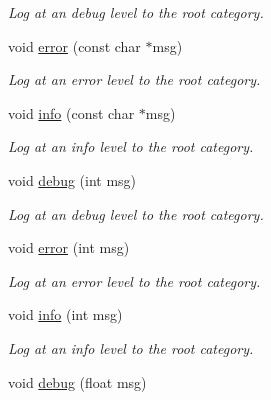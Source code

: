 \begin{DoxyCompactItemize}
\begin{DoxyCompactList}\small\item\em Log at an debug level to the root category. \end{DoxyCompactList}\item 
\hypertarget{classLogger_ac1d4d3c78b25175e64481f6191f2faee}{void \hyperlink{classLogger_ac1d4d3c78b25175e64481f6191f2faee}{error} (const char $\ast$msg)}\label{classLogger_ac1d4d3c78b25175e64481f6191f2faee}

\begin{DoxyCompactList}\small\item\em Log at an error level to the root category. \end{DoxyCompactList}\item 
\hypertarget{classLogger_ab0a890754ae7bb8bf0431ad52dc4c36c}{void \hyperlink{classLogger_ab0a890754ae7bb8bf0431ad52dc4c36c}{info} (const char $\ast$msg)}\label{classLogger_ab0a890754ae7bb8bf0431ad52dc4c36c}

\begin{DoxyCompactList}\small\item\em Log at an info level to the root category. \end{DoxyCompactList}\item 
\hypertarget{classLogger_ab4951fcaf2739abc8bad2c75ef10fbfc}{void \hyperlink{classLogger_ab4951fcaf2739abc8bad2c75ef10fbfc}{debug} (int msg)}\label{classLogger_ab4951fcaf2739abc8bad2c75ef10fbfc}

\begin{DoxyCompactList}\small\item\em Log at an debug level to the root category. \end{DoxyCompactList}\item 
\hypertarget{classLogger_a73505ea080d5a2a0280b478899275060}{void \hyperlink{classLogger_a73505ea080d5a2a0280b478899275060}{error} (int msg)}\label{classLogger_a73505ea080d5a2a0280b478899275060}

\begin{DoxyCompactList}\small\item\em Log at an error level to the root category. \end{DoxyCompactList}\item 
\hypertarget{classLogger_a3148767140a9569305fdbd5283158027}{void \hyperlink{classLogger_a3148767140a9569305fdbd5283158027}{info} (int msg)}\label{classLogger_a3148767140a9569305fdbd5283158027}

\begin{DoxyCompactList}\small\item\em Log at an info level to the root category. \end{DoxyCompactList}\item 
\hypertarget{classLogger_aa7242e859f14a91ad3f7501dc5f85b4b}{void \hyperlink{classLogger_aa7242e859f14a91ad3f7501dc5f85b4b}{debug} (float msg)}\label{classLogger_aa7242e859f14a91ad3f7501dc5f85b4b}


\end{DoxyCompactItemize}
